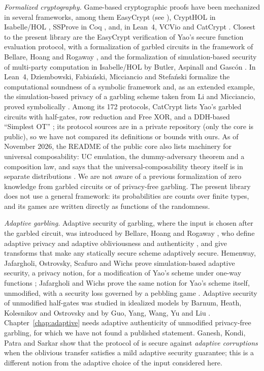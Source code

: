 \emph{Formalized cryptography.} Game-based cryptographic proofs have been mechanized in several
frameworks, among them EasyCrypt (see \cite{ABB+17}), CryptHOL in Isabelle/HOL \cite{BLS20},
SSProve in Coq \cite{HRV+23}, and, in Lean~4, VCVio \cite{TDW+26} and CatCrypt \cite{Spi26}. Closest to the present library are the EasyCrypt verification of
Yao's secure function evaluation protocol, with a formalization of garbled circuits in the framework
of Bellare, Hoang and Rogaway \cite{ABB+17, BHR12b}, and the formalization of simulation-based
security of multi-party computation in Isabelle/HOL by Butler, Aspinall and Gascón \cite{BAG17}.
In Lean~4, Dziembowski, Fabia\'nski, Micciancio and Stefa\'nski formalize the computational
soundness of a symbolic framework and, as an extended example, the simulation-based privacy of a
garbling scheme taken from Li and Micciancio, proved symbolically \cite[Sect.~3]{DFMS26}.
Among its 172 protocols, CatCrypt lists Yao's garbled circuits with half-gates, row reduction and
Free XOR, and a DDH-based ``Simplest OT'' \cite[Sect.~4]{Spi26}; its protocol sources are in a
private repository \cite[Sect.~7]{Spi26} (only the core is public), so we have not compared its definitions or bounds with ours. As of
November 2026, the README of the public core also lists machinery for universal composability: UC
emulation, the dummy-adversary theorem and a composition law, and says that the
universal-composability theory itself is in separate distributions \cite{CCcore}.
We are not aware of a previous formalization of zero knowledge from garbled circuits or of
privacy-free garbling. The present library does not use a general framework: its probabilities are counts over
finite types, and its games are written directly as functions of the randomness.

\emph{Adaptive garbling.} Adaptive security of garbling, where the input is chosen after the
garbled circuit, was introduced by Bellare, Hoang and Rogaway \cite{BHR12}, who define adaptive
privacy \cite[Sect.~3, Fig.~2]{BHR12} and adaptive obliviousness and authenticity
\cite[Sect.~4, Fig.~6]{BHR12}, and give transforms that
make any statically secure scheme adaptively secure. Hemenway, Jafargholi, Ostrovsky, Scafuro and
Wichs prove simulation-based adaptive security, a privacy notion, for a modification of Yao's scheme
under one-way functions \cite[Sect.~3 and~5]{HJO+16}; Jafargholi and Wichs prove the same notion for
Yao's scheme itself, unmodified, with a security loss governed by a pebbling game
\cite[Sect.~3 and Theorem~1]{JW16}. Adaptive security of unmodified half-gates was studied in idealized models by Barnum,
Heath, Kolesnikov and Ostrovsky \cite{BHKO26} and by Guo, Yang, Wang, Yu and Liu \cite{GYWYL}.
Chapter~\ref{chap:adaptive} needs adaptive authenticity of unmodified privacy-free garbling, for
which we have not found a published statement.
Ganesh, Kondi, Patra and Sarkar \cite[Sect.~3]{GKPS18} show that the protocol of \cite{JKO13} is secure
against \emph{adaptive corruptions} when the oblivious transfer satisfies a mild adaptive security
guarantee; this is a different notion from the adaptive choice of the input considered here.

